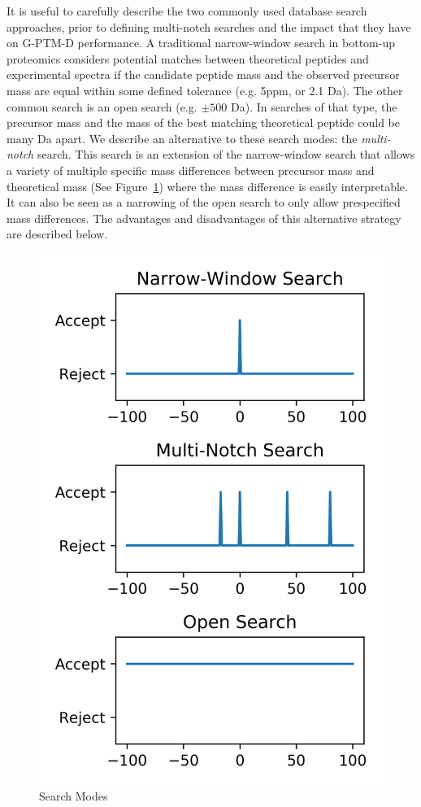 \documentclass[journal=jprobs,manuscript=article]{achemso}
\begin{document}
It is useful to carefully describe the two commonly used database search approaches, prior to defining multi-notch searches and the impact that they have on G-PTM-D performance.
A traditional narrow-window search in bottom-up proteomics considers potential matches between theoretical peptides and experimental spectra if the candidate peptide mass and the observed precursor mass are equal within some defined tolerance (e.g. 5ppm, or 2.1 Da).
The other common search is an open search (e.g. $\pm 500$ Da)\citep{Chick_2015,Kong_2017,Li_2016}.
In searches of that type, the precursor mass and the mass of the best matching theoretical peptide could be many Da apart.
We describe an alternative to these search modes: the \textit{multi-notch} search.
This search is an extension of the narrow-window search that allows a variety of multiple specific mass differences between precursor mass and theoretical mass (See Figure~\ref{fig:fig3-searchTypes}) where the mass difference is easily interpretable.
It can also be seen as a narrowing of the open search to only allow prespecified mass differences.
The advantages and disadvantages of this alternative strategy are described below.

\begin{figure}[H]
\includegraphics{fig3-searchTypes.png}
\caption{Search Modes}
\label{fig:fig3-searchTypes}
\end{figure}
\end{document}
